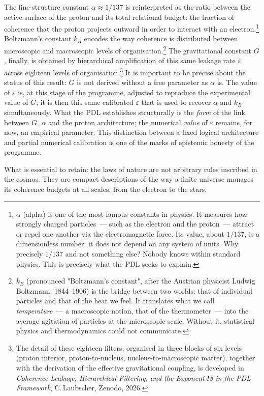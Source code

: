 \documentclass[12pt, a4paper, openright]{book}
\begin{document}
The fine-structure constant $\alpha \approx 1/137$ is reinterpreted as the ratio between the active surface of the proton and its total relational budget: the fraction of coherence that the proton projects outward in order to interact with an electron.\footnote{$\alpha$ (alpha) is one of the most famous constants in physics. It measures how strongly charged particles~--- such as the electron and the proton~--- attract or repel one another via the electromagnetic force. Its value, about $1/137$, is a dimensionless number: it does not depend on any system of units. Why precisely $1/137$ and not something else? Nobody knows within standard physics. This is precisely what the PDL seeks to explain.} Boltzmann's constant $k_B$ encodes the way coherence is distributed between microscopic and macroscopic levels of organisation.\footnote{$k_B$ (pronounced "Boltzmann's constant", after the Austrian physicist Ludwig Boltzmann, 1844--1906) is the bridge between two worlds: that of individual particles and that of the heat we feel. It translates what we call \emph{temperature}~--- a macroscopic notion, that of the thermometer~--- into the average agitation of particles at the microscopic scale. Without it, statistical physics and thermodynamics could not communicate.} The gravitational constant $G$, finally, is obtained by hierarchical amplification of this same leakage rate $\varepsilon$ across eighteen levels of organisation.\footnote{The detail of these eighteen filters, organised in three blocks of six levels (proton interior, proton-to-nucleus, nucleus-to-macroscopic matter), together with the derivation of the effective gravitational coupling, is developed in \textit{Coherence Leakage, Hierarchical Filtering, and the Exponent\,18 in the PDL Framework}, C.\,Laubscher, Zenodo, 2026.} It is important to be precise about the status of this result: $G$ is not derived without a free parameter as $\alpha$ is. The value of $\varepsilon$ is, at this stage of the programme, adjusted to reproduce the experimental value of $G$; it is then this same calibrated $\varepsilon$ that is used to recover $\alpha$ and $k_B$ simultaneously. What the PDL establishes structurally is the \emph{form} of the link between $G$, $\alpha$ and the proton architecture; the numerical \emph{value} of $\varepsilon$ remains, for now, an empirical parameter. This distinction between a fixed logical architecture and partial numerical calibration is one of the marks of epistemic honesty of the programme.

\medskip

What is essential to retain: the laws of nature are not arbitrary rules inscribed in the cosmos. They are compact descriptions of the way a finite universe manages its coherence budgets at all scales, from the electron to the stars.
\end{document}
